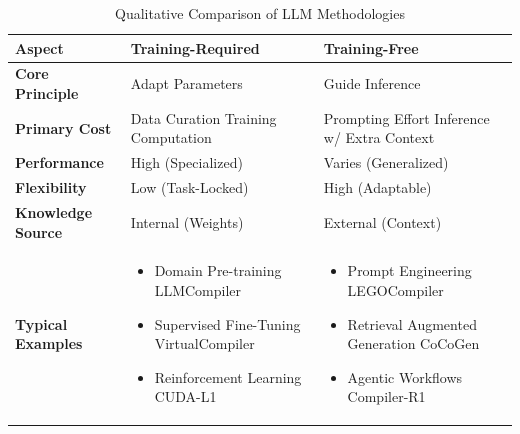 \documentclass[pdflatex,sn-mathphys-ay,twocolumn, a4paper]{sn-jnl}%
\theoremstyle{thmstyleone}%
\theoremstyle{thmstyletwo}%
\theoremstyle{thmstylethree}%
\begin{document}
\begin{table}[t]
    \centering
    \begin{tabularx}{\textwidth}{|l|X|X|}
    \hline
    
    \textbf{Aspect} & \textbf{Training-Required} & \textbf{Training-Free} \\
    \hline
    
    \textbf{Core Principle} & Adapt Parameters & Guide Inference \\
    \hline
    
    \textbf{Primary Cost} & Data Curation \newline Training Computation & Prompting Effort \newline Inference w/ Extra Context \\
    \hline
    
    \textbf{Performance} & High (Specialized) & Varies (Generalized) \\
    \hline
    
    \textbf{Flexibility} & Low (Task-Locked) & High (Adaptable) \\
    \hline
    
    \textbf{Knowledge Source} & Internal (Weights) & External (Context) \\
    \hline
    
    \textbf{Typical Examples} & 
        \begin{itemize}[leftmargin=*, nosep]
             \item Domain Pre-training \newline LLMCompiler~\citep{metallmcompiler-cc25}
             \item Supervised Fine-Tuning \newline VirtualCompiler~\citep{71_gao-etal-2024-virtual}
             \item Reinforcement Learning \newline CUDA-L1~\citep{cudal1_2025_arxiv}
        \end{itemize} & 
        \begin{itemize}[leftmargin=*, nosep]
             \item Prompt Engineering \newline LEGOCompiler~\citep{5_legocompiler-arxiv25}
             \item Retrieval Augmented Generation \newline CoCoGen~\citep{110_bi-etal-2024-iterative}
             \item Agentic Workflows \newline Compiler-R1~\citep{45_compilerr1-2025_arxiv}
        \end{itemize} \\
    \hline
    \end{tabularx}
    \caption{Qualitative Comparison of LLM Methodologies}
    \label{tab:methodology_comparison}
\end{table}
\end{document}
